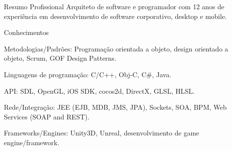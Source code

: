 \documentclass{resume}
\begin{document}
  \begin{rSection}{Resumo Profissional}
  Arquiteto de software e programador com 12 anos de experiência em desenvolvimento de software corporativo, desktop e mobile. \\

    \begin{rSubsection}{Conhecimentos}{}{}{}
      \item Metodologias/Padrões: Programação orientada a objeto, design orientado a objeto, Scrum, GOF Design Patterns.
      \item Linguagens de programação: C/C++, Obj-C, C\#, Java.
      \item API: SDL, OpenGL, iOS SDK, cocos2d, DirectX, GLSL, HLSL.
      \item Rede/Integração: JEE (EJB, MDB, JMS, JPA), Sockets, SOA, BPM, Web Services (SOAP and REST).
      \item Frameworks/Engines: Unity3D, Unreal, desenvolvimento de game engine/framework.

    \end{rSubsection}
  \end{rSection}
\end{document}
